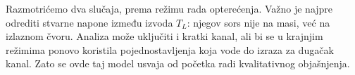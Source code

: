 Razmotrićemo dva slučaja, prema režimu rada opterećenja. Važno je najpre odrediti stvarne napone između izvoda $T_L$: njegov sors nije na masi, već na izlaznom čvoru. Analiza može uključiti i kratki kanal, ali bi se u krajnjim režimima ponovo koristila pojednostavljenja koja vode do izraza za dugačak kanal. Zato se ovde taj model usvaja od početka radi kvalitativnog objašnjenja.
